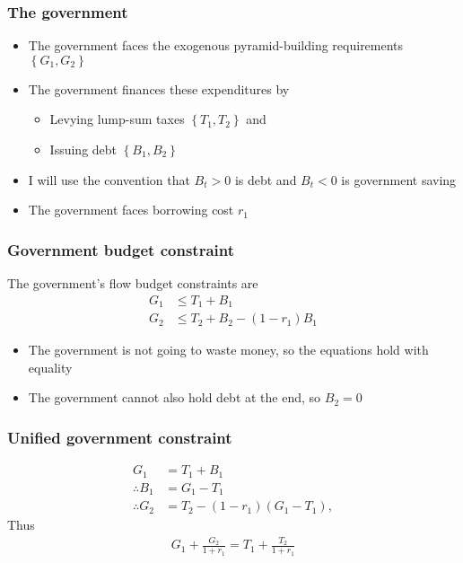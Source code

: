 \documentclass[presentation,dvipsnames]{beamer}
\begin{document}
\begin{frame}
\frametitle{The government}
\begin{itemize}[label={--}]
\item The government faces the exogenous pyramid-building requirements $\left\{ G_{1},G_{2} \right\}$
\item The government finances these expenditures by
\begin{itemize}[label={--}]
\item Levying lump-sum taxes $\left\{ T_{1},T_{2} \right\}$ and
\item Issuing debt $\left\{ B_{1},B_{2} \right\}$
\end{itemize}
\item I will use the convention that $B_{t} > 0$ is debt and $B_{t} < 0$ is government saving
\item The government faces borrowing cost $r_{1}$
\end{itemize}
\end{frame}

\begin{frame}
\frametitle{Government budget constraint}
The government's flow budget constraints are
\begin{align*}
G_{1} &\leq T_{1} + B_{1} \\
G_{2} &\leq T_{2} + B_{2} - (1-r_{1})B_{1}
\end{align*}
\begin{itemize}[label={--}]
\item The government is not going to waste money, so the equations hold with equality
\item The government cannot also hold debt at the end, so $B_{2} = 0$
\end{itemize}
\end{frame}

\begin{frame}
\frametitle{Unified government constraint}
\begin{align*}
G_{1} &= T_{1} + B_{1} \\
\therefore B_{1} &= G_{1} - T_{1} \\
\therefore G_{2} &= T_{2} - (1-r_{1}) \left( G_{1} - T_{1} \right),
\end{align*}
Thus
\begin{align*}
G_{1} + \frac{G_{2}}{1+r_{1}} = T_{1} + \frac{T_{2}}{1+r_{1}}
\end{align*}
\end{frame}
\end{document}
